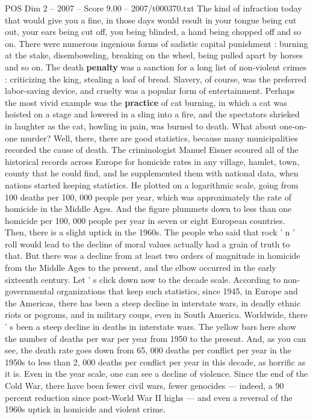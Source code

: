 \begin{textsample}{POS Dim 2 – 2007 – Score 9.00 – 2007/t000370.txt}
The kind of infraction today that would give you a fine, in those days would result in your tongue being cut out, your ears being cut off, you being blinded, a hand being chopped off and so on.
There were numerous ingenious forms of sadistic capital punishment : burning at the stake, disemboweling, breaking on the wheel, being pulled apart by horses and so on.
The death \textbf{penalty} was a sanction for a long list of non-violent crimes : criticizing the king, stealing a loaf of bread.
Slavery, of course, was the preferred labor-saving device, and cruelty was a popular form of entertainment.
Perhaps the most vivid example was the \textbf{practice} of cat burning, in which a cat was hoisted on a stage and lowered in a sling into a fire, and the spectators shrieked in laughter as the cat, howling in pain, was burned to death.
What about one-on-one murder?
Well, there, there are good statistics, because many municipalities recorded the cause of death.
The criminologist Manuel Eisner scoured all of the historical records across Europe for homicide rates in any village, hamlet, town, county that he could find, and he supplemented them with national data, when nations started keeping statistics.
He plotted on a logarithmic scale, going from 100 deaths per 100, 000 people per year, which was approximately the rate of homicide in the Middle Ages.
And the figure plummets down to less than one homicide per 100, 000 people per year in seven or eight European countries.
Then, there is a slight uptick in the 1960s.
The people who said that rock ' n ' roll would lead to the decline of moral values actually had a grain of truth to that.
But there was a decline from at least two orders of magnitude in homicide from the Middle Ages to the present, and the elbow occurred in the early sixteenth century.
Let ' s click down now to the decade scale.
According to non-governmental organizations that keep such statistics, since 1945, in Europe and the Americas, there has been a steep decline in interstate wars, in deadly ethnic riots or pogroms, and in military coups, even in South America.
Worldwide, there ' s been a steep decline in deaths in interstate wars.
The yellow bars here show the number of deaths per war per year from 1950 to the present.
And, as you can see, the death rate goes down from 65, 000 deaths per conflict per year in the 1950s to less than 2, 000 deaths per conflict per year in this decade, as horrific as it is.
Even in the year scale, one can see a decline of violence.
Since the end of the Cold War, there have been fewer civil wars, fewer genocides — indeed, a 90 percent reduction since post-World War II highs — and even a reversal of the 1960s uptick in homicide and violent crime.

\end{textsample}
